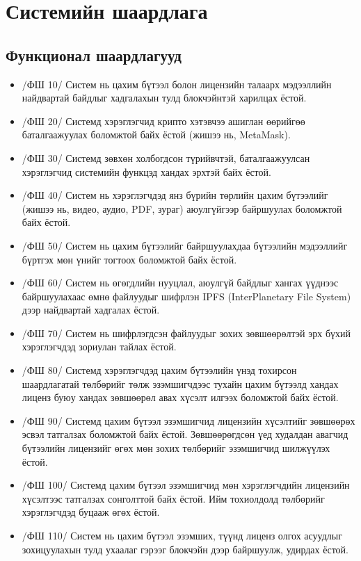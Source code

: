 \section{Системийн шаардлага}

\subsection{Функционал шаардлагууд}
\begin{itemize}
      \item[] /ФШ 10/ Систем нь цахим бүтээл болон лицензийн талаарх мэдээллийн найдвартай байдлыг хадгалахын тулд блокчэйнтэй харилцах ёстой.
      \item[] /ФШ 20/ Системд хэрэглэгчид крипто хэтэвчээ ашиглан өөрийгөө баталгаажуулах боломжтой байх ёстой (жишээ нь, MetaMask).
      \item[] /ФШ 30/ Системд зөвхөн холбогдсон түрийвчтэй, баталгаажуулсан хэрэглэгчид системийн функцэд хандах эрхтэй байх ёстой.
      \item[] /ФШ 40/ Систем нь хэрэглэгчдэд янз бүрийн төрлийн цахим бүтээлийг (жишээ нь, видео, аудио, PDF, зураг) аюулгүйгээр байршуулах боломжтой байх ёстой.
      \item[] /ФШ 50/ Систем нь цахим бүтээлийг байршуулахдаа бүтээлийн мэдээллийг бүртгэх мөн үнийг тогтоох боломжтой байх ёстой.
      \item[] /ФШ 60/ Систем нь өгөгдлийн нууцлал, аюулгүй байдлыг хангах үүднээс байршуулахаас өмнө файлуудыг шифрлэн IPFS (InterPlanetary File System) дээр найдвартай хадгалах ёстой.
      \item[] /ФШ 70/ Систем нь шифрлэгдсэн файлуудыг зохих зөвшөөрөлтэй эрх бүхий хэрэглэгчдэд зориулан тайлах ёстой.
      \item[] /ФШ 80/ Системд хэрэглэгчдэд цахим бүтээлийн үнэд тохирсон шаардлагатай төлбөрийг төлж эзэмшигчдээс тухайн цахим бүтээлд хандах лиценз буюу хандах зөвшөөрөл авах хүсэлт илгээх боломжтой байх ёстой.
      \item[] /ФШ 90/  Системд цахим бүтээл эзэмшигчид лицензийн хүсэлтийг зөвшөөрөх эсвэл татгалзах боломжтой байх ёстой. Зөвшөөрөгдсөн үед худалдан авагчид бүтээлийн лицензийг өгөх мөн зохих төлбөрийг эзэмшигчид шилжүүлэх ёстой.
      \item[] /ФШ 100/  Системд цахим бүтээл эзэмшигчид мөн хэрэглэгчдийн лицензийн хүсэлтээс татгалзах сонголттой байх ёстой. Ийм тохиолдолд төлбөрийг хэрэглэгчдэд буцааж өгөх ёстой.
      \item[] /ФШ 110/  Систем нь цахим бүтээл эзэмших, түүнд лиценз олгох асуудлыг зохицуулахын тулд ухаалаг гэрээг блокчэйн дээр байршуулж, удирдах ёстой.

\end{itemize}
